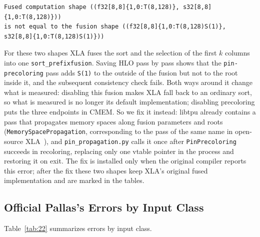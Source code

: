 \documentclass[sigconf,nonacm,balance=false]{acmart}
\newcommand{\code}[1]{\texttt{#1}}
\begin{document}
\begin{lstlisting}
Fused computation shape ((f32[8,8]{1,0:T(8,128)}, s32[8,8]{1,0:T(8,128)}))
is not equal to the fusion shape ((f32[8,8]{1,0:T(8,128)S(1)}, s32[8,8]{1,0:T(8,128)S(1)}))
\end{lstlisting}
For these two shapes XLA fuses the sort and the selection of the first $k$ columns into one \code{sort\_\allowbreak{}prefixfusion}. Saving HLO pass by pass shows that the \code{pin-precoloring} pass adds \code{S(\allowbreak{}1)} to the outside of the fusion but not to the root inside it, and the subsequent consistency check fails. Both ways around it change what is measured: disabling this fusion makes XLA fall back to an ordinary sort, so what is measured is no longer its default implementation; disabling precoloring puts the three endpoints in CMEM. So we fix it instead: libtpu already contains a pass that propagates memory spaces along fusion parameters and roots (\code{Memory\allowbreak{}Space\allowbreak{}Propagation}, corresponding to the pass of the same name in open-source XLA~\cite{xla-memory-space-propagation}), and \code{pin\_\allowbreak{}propagation.\allowbreak{}py} calls it once after \code{Pin\allowbreak{}Precoloring} succeeds in recoloring, replacing only one vtable pointer in the process and restoring it on exit. The fix is installed only when the original compiler reports this error; after the fix these two shapes keep XLA's original fused implementation and are marked \ddag{} in the tables.

\subsection{Official Pallas's Errors by Input Class}
\label{sec:C.3}

Table~\ref{tab:22} summarizes errors by input class.
\end{document}
